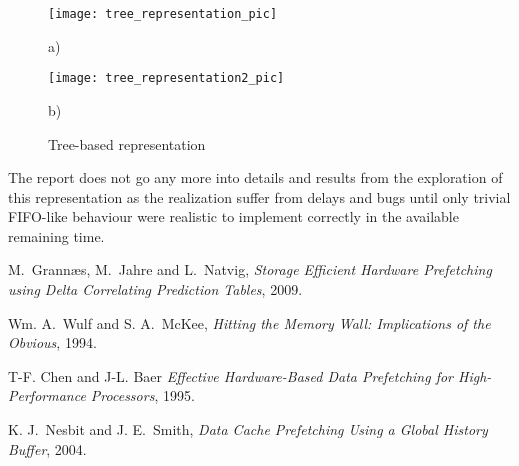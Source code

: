 \documentclass[12pt,journal,compsoc]{IEEEtran}
\begin{document}
\begin{figure}
\begin{center}
\texttt{[image: tree\_representation\_pic]}

a)
\end{center}
\begin{center}
\texttt{[image: tree\_representation2\_pic]}

b)
\end{center}
\caption{\label{fig:DG} Tree-based representation}
\end{figure}

The report does not go any more into details and results from the
exploration of this representation as the realization suffer from
delays and bugs until only trivial FIFO-like behaviour were realistic 
to implement correctly in the available remaining time.

\ifCLASSOPTIONcompsoc
\else
\fi


\ifCLASSOPTIONcaptionsoff
  \newpage
\fi



\begin{thebibliography}{1}

M.~Grann\ae s, M.~Jahre and L.~Natvig, \emph{Storage Efficient Hardware Prefetching using Delta Correlating Prediction Tables}, 2009.

Wm. A.~Wulf and S. A.~McKee, \emph{Hitting the Memory Wall: Implications of the
Obvious}, 1994.

T-F. Chen and J-L. Baer \emph{Effective Hardware-Based Data Prefetching for
High-Performance Processors}, 1995.

K. J.~Nesbit and J. E.~Smith, \emph{Data Cache Prefetching Using a Global History
Buffer}, 2004.

\end{thebibliography}



\end{document}
